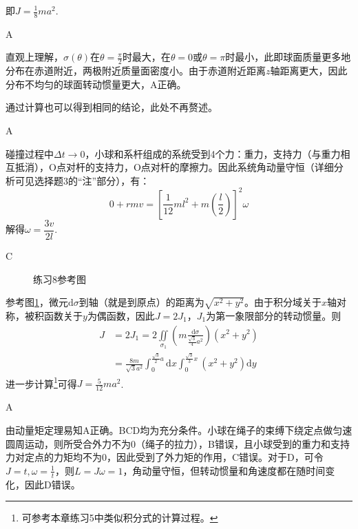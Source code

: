 \documentclass[b5paper,opensource,sourcefont,parskip]{qyxf-book}
\newcommand{\di}[1]{\mathrm{d}#1}
\newcommand{\zbj}[4]
{
	\draw (0,0) node[below left] {$ O $};
	\draw [->] (#1,0) -- (#2,0) node[right] {$ x $};
	\draw [->] (0,#3) -- (0,#4) node[right] {$ y $};
}
\begin{document}
即$ J=\frac{1}{8}ma^2 $.

A

\solve 直观上理解，$ \sigma(\theta) $在$ \theta=\frac{\pi}{2} $时最大，在$ \theta=0 $或$ \theta=\pi $时最小，此即球面质量更多地分布在赤道附近，两极附近质量面密度小。由于赤道附近距离$ z $轴距离更大，因此分布不均匀的球面转动惯量更大，A正确。\par
通过计算也可以得到相同的结论，此处不再赘述。

A

\solve 碰撞过程中$ \Delta t\to 0 $，小球和系杆组成的系统受到4个力：重力，支持力（与重力相互抵消），O点对杆的支持力，O点对杆的摩擦力。因此系统角动量守恒（详细分析可见选择题3的“注”部分），有：
\[0+rmv=\left[\frac{1}{12}ml^2+m\left(\frac{l}{2}\right)\right]^2\omega\]
解得$\omega=\dfrac{3v}{2l}$.

C

\begin{figure}[htbp]
	\centering
	\caption{练习8参考图}\label{fig:c4-t8}
\end{figure}

\solve 参考图\ref{fig:c4-t8}，微元$ \di{\sigma} $到轴（就是到原点）的距离为$ \sqrt{x^2+y^2} $。由于积分域关于$ x $轴对称，被积函数关于$ y $为偶函数，因此$ J=2J_1 $，$ J_1 $为第一象限部分的转动惯量。则
\begin{align*}
J&=2J_1=2\iint\limits_{\sigma_1}\left(m\frac{\di{\sigma}}{\frac{\sqrt{3}}{4}a^2}\right)(x^2+y^2)\\
&=\frac{8m}{\sqrt{3}a^2}\int_0^{\frac{\sqrt{3}}{2}a}\di{x}\int_0^{\frac{\sqrt{3}}{3}x}(x^2+y^2)\di{y}
\end{align*}
进一步计算\footnote{可参考本章练习5中类似积分式的计算过程。}可得$ J=\frac{5}{12}ma^2 $.

A

\solve 由动量矩定理易知A正确。BCD均为充分条件。小球在绳子的束缚下绕定点做匀速圆周运动，则所受合外力不为0（绳子的拉力），B错误，且小球受到的重力和支持力对定点的力矩均不为0，因此受到了外力矩的作用，C错误。对于D，可令$ J=t,\omega=\frac{1}{t} $，则$ L=J\omega=1 $，角动量守恒，但转动惯量和角速度都在随时间变化，因此D错误。
\end{document}
